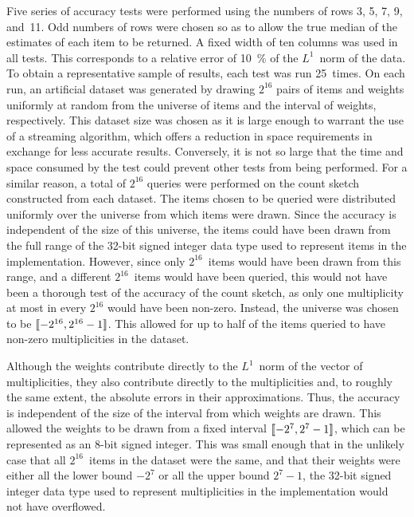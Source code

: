 Five series of accuracy tests were performed using the numbers of rows \num{3}, \num{5}, \num{7}, \num{9}, and~\num{11}.
Odd numbers of rows were chosen so as to allow the true median of the estimates of each item to be returned.
A fixed width of ten columns was used in all tests.
This corresponds to a relative error of \SI{10}{\percent} of the \( L^{1} \)~norm of the data.
To obtain a representative sample of results, each test was run \num{25}~times.
On each run, an artificial dataset was generated by drawing \( 2^{16} \) pairs of items and weights uniformly at random from the universe of items and the interval of weights, respectively.
This dataset size was chosen as it is large enough to warrant the use of a streaming algorithm, which offers a reduction in space requirements in exchange for less accurate results.
Conversely, it is not so large that the time and space consumed by the test could prevent other tests from being performed.
For a similar reason, a total of \( 2^{16} \) queries were performed on the count sketch constructed from each dataset.
The items chosen to be queried were distributed uniformly over the universe from which items were drawn.
Since the accuracy is independent of the size of this universe, the items could have been drawn from the full range of the \num{32}-bit signed integer data type used to represent items in the implementation.
However, since only \( 2^{16} \)~items would have been drawn from this range, and a different \( 2^{16} \)~items would have been queried, this would not have been a thorough test of the accuracy of the count sketch, as only one multiplicity at most in every \( 2^{16} \) would have been non-zero.
Instead, the universe was chosen to be \( \llbracket-2^{16}, 2^{16} - 1\rrbracket \).
This allowed for up to half of the items queried to have non-zero multiplicities in the dataset.

Although the weights contribute directly to the \( L^{1} \)~norm of the vector of multiplicities, they also contribute directly to the multiplicities and, to roughly the same extent, the absolute errors in their approximations.
Thus, the accuracy is independent of the size of the interval from which weights are drawn.
This allowed the weights to be drawn from a fixed interval \( \llbracket-2^{7}, 2^{7} - 1\rrbracket \), which can be represented as an \num{8}-bit signed integer.
This was small enough that in the unlikely case that all \( 2^{16} \)~items in the dataset were the same, and that their weights were either all the lower bound \( -2^{7} \) or all the upper bound \( 2^{7} - 1 \), the \num{32}-bit signed integer data type used to represent multiplicities in the implementation would not have overflowed.


